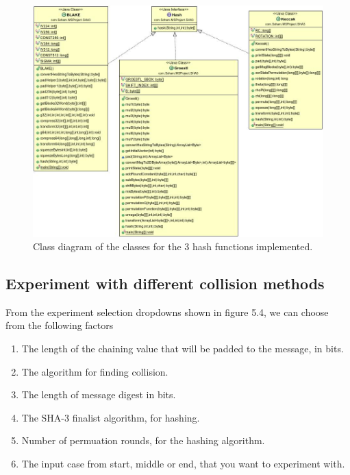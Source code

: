 \begin{figure}
  \begin{center}
    \includegraphics[width=6.8	in]{SHA3classes.jpg}
  \end{center}
  \caption{Class diagram of the classes for the 3 hash functions implemented.}
  \label{fig:UMLSHA3classes}
\end{figure}

\subsection{Experiment with different collision methods}

From the experiment selection dropdowns shown in figure 5.4, we can choose from the following factors
\begin{enumerate}
  \item The length of the chaining value that will be padded to the message, in bits.
  \item The algorithm for finding collision.
  \item The length of message digest in bits.
  \item The SHA-3 finalist algorithm, for hashing.
  \item Number of permuation rounds, for the hashing algorithm.
  \item The input case from start, middle or end, that you want to experiment with.
\end{enumerate}

